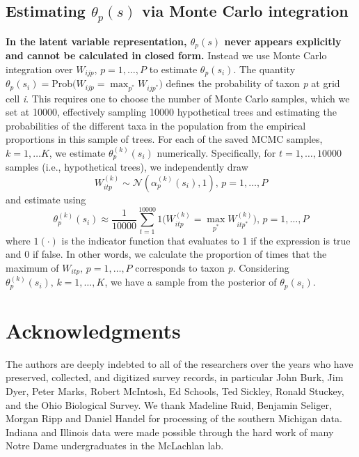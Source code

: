 \documentclass[10pt,letterpaper]{article}
\newcommand{\N}{\mathcal{N}}
\begin{document}
\subsection*{Estimating $\theta_{p}(s)$ via Monte Carlo integration}
\label{SI1}
{\bf In the latent variable representation, $\theta_{p}(s)$ never appears
explicitly and cannot be calculated in closed form.} Instead we use
Monte Carlo integration over $W_{ijp},\, p=1,\ldots,P$ to estimate
$\theta_{p}(s_{i})$. The quantity $\theta_{p}(s_{i})=\mbox{Prob}(W_{ijp}={\displaystyle \max_{p^{*}}W_{ijp^{*}})}$
defines the probability of taxon \emph{p} at grid cell \emph{i}. This requires
one to choose the number of Monte Carlo samples, which we set at 10000,
effectively sampling 10000 hypothetical trees and estimating the probabilities
of the different taxa in the population from the empirical proportions
in this sample of trees. For each of the saved MCMC samples, $k=1,\ldots K$,
we estimate $\theta_{p}^{(k)}(s_{i})$ numerically. Specifically,
for $t=1,\ldots,10000$ samples (i.e., hypothetical trees), we independently
draw
\[
W_{itp}^{(k)}\sim\N(\alpha_{p}^{(k)}(s_{i}),1),\, p=1,\ldots,P
\]
and estimate using 
\[
\theta_{p}^{(k)}(s_{i})\approx\frac{1}{10000}{\displaystyle \sum_{t=1}^{10000}1(W_{itp}^{(k)}={\displaystyle \max_{p^{*}}W_{itp^{*}}^{(k)})}},\, p=1,\ldots,P
\]
where $1(\cdot)$ is the indicator function that evaluates to 1 if
the expression is true and 0 if false. In other words, we calculate
the proportion of times that the maximum of $W_{itp},\, p=1,\ldots,P$
corresponds to taxon \emph{p}. Considering $\theta_{p}^{(k)}(s_{i}),\, k=1,\ldots,K$,
we have a sample from the posterior of $\theta_{p}(s_{i})$.

\section*{Acknowledgments}
The authors are deeply indebted to all of the researchers over the
years who have preserved, collected, and digitized survey records,
in particular John Burk, Jim Dyer, Peter Marks, Robert McIntosh, Ed
Schools, Ted Sickley, Ronald Stuckey, and the Ohio Biological Survey.
We thank Madeline Ruid, Benjamin Seliger, Morgan Ripp and Daniel Handel
for processing of the southern Michigan data. Indiana and Illinois
data were made possible through the hard work of many Notre Dame undergraduates
in the McLachlan lab. 
\end{document}
